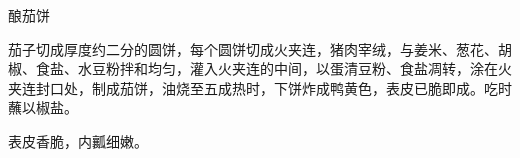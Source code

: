 \begin{recipe}{酿茄饼}

\ingredients


\cooking

茄子切成厚度约二分的圆饼，每个圆饼切成火夹连，猪肉宰绒，与姜米、葱花、胡椒、食盐、水豆粉拌和均匀，灌入火夹连的中间，以蛋清豆粉、食盐凋转，涂在火夹连封口处，制成茄饼，油烧至五成热时，下饼炸成鸭黄色，表皮已脆即成。吃时蘸以椒盐。

\notes

表皮香脆，内瓤细嫩。

\end{recipe}

